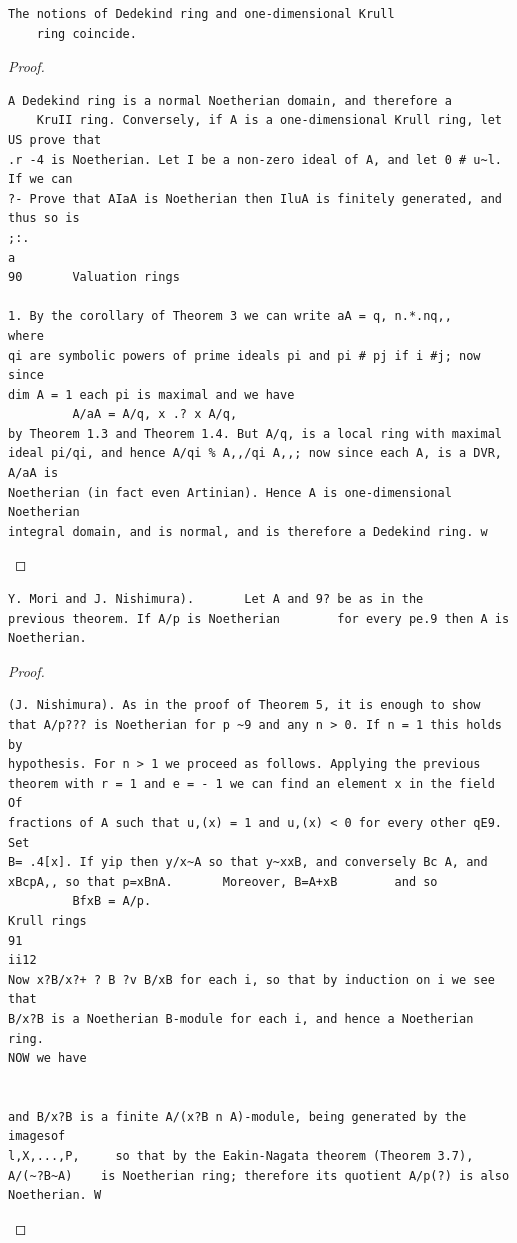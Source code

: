 \begin{theorem}\label{mcrt-auto-theorem-12-5}\uses{}
\begin{verbatim}
The notions of Dedekind ring and one-dimensional Krull
    ring coincide.
\end{verbatim}
\end{theorem}
\begin{proof}
\begin{verbatim}
A Dedekind ring is a normal Noetherian domain, and therefore a
    KruII ring. Conversely, if A is a one-dimensional Krull ring, let US prove that
.r -4 is Noetherian. Let I be a non-zero ideal of A, and let 0 # u~l. If we can
?- Prove that AIaA is Noetherian then IluA is finitely generated, and thus so is
;:.
a
90       Valuation rings

1. By the corollary of Theorem 3 we can write aA = q, n.*.nq,,    where
qi are symbolic powers of prime ideals pi and pi # pj if i #j; now since
dim A = 1 each pi is maximal and we have
         A/aA = A/q, x .? x A/q,
by Theorem 1.3 and Theorem 1.4. But A/q, is a local ring with maximal
ideal pi/qi, and hence A/qi % A,,/qi A,,; now since each A, is a DVR, A/aA is
Noetherian (in fact even Artinian). Hence A is one-dimensional Noetherian
integral domain, and is normal, and is therefore a Dedekind ring. w
\end{verbatim}
\end{proof}


\begin{theorem}\label{mcrt-auto-theorem-12-7}\uses{}
\begin{verbatim}
Y. Mori and J. Nishimura).       Let A and 9? be as in the
previous theorem. If A/p is Noetherian        for every pe.9 then A is
Noetherian.
\end{verbatim}
\end{theorem}
\begin{proof}
\begin{verbatim}
(J. Nishimura). As in the proof of Theorem 5, it is enough to show
that A/p??? is Noetherian for p ~9 and any n > 0. If n = 1 this holds by
hypothesis. For n > 1 we proceed as follows. Applying the previous
theorem with r = 1 and e = - 1 we can find an element x in the field Of
fractions of A such that u,(x) = 1 and u,(x) < 0 for every other qE9. Set
B= .4[x]. If yip then y/x~A so that y~xxB, and conversely Bc A, and
xBcpA,, so that p=xBnA.       Moreover, B=A+xB        and so
         BfxB = A/p.
Krull rings                                                                   91
ii12
Now x?B/x?+ ? B ?v B/xB for each i, so that by induction on i we see that
B/x?B is a Noetherian B-module for each i, and hence a Noetherian ring.
NOW we have


and B/x?B is a finite A/(x?B n A)-module, being generated by the imagesof
l,X,...,P,     so that by the Eakin-Nagata theorem (Theorem 3.7),
A/(~?B~A)    is Noetherian ring; therefore its quotient A/p(?) is also
Noetherian. W
\end{verbatim}
\end{proof}


